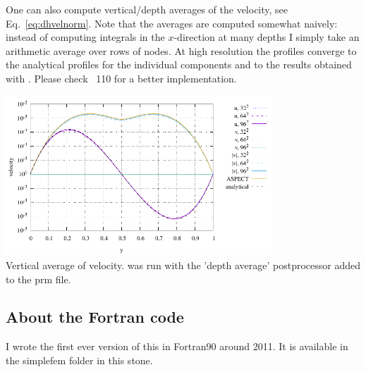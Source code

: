 One can also compute vertical/depth averages of the velocity, see Eq.~\eqref{eq:dhvelnorm}.
Note that the averages are computed somewhat naively: instead of computing integrals in the $x$-direction
at many depths I simply take an arithmetic average over rows of nodes. At high resolution the profiles
converge to the analytical profiles for the individual components and to the results 
obtained with \aspect. Please check \stone~110 for a better implementation.
\begin{center}
\includegraphics[width=10cm]{python_codes/fieldstone_01/results/vel_profile}\\
{\captionfont Vertical average of velocity. \aspect was run with the 'depth average' postprocessor
added to the prm file.}
\end{center}

\newpage
\subsection*{About the Fortran code}

I wrote the first ever version of this \stone in
Fortran90 around 2011. It is available in the {\foldernamefont simplefem} folder in this stone.

